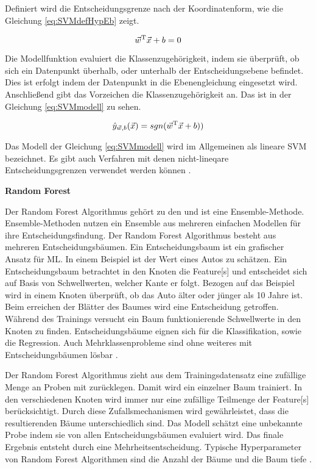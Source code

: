 
Definiert wird die Entscheidungsgrenze nach der Koordinatenform, wie die Gleichung \ref{eq:SVMdefHypEb} zeigt.

\begin{equation}
\vec{w}^\mathrm{T}\vec{x}+b=0
\label{eq:SVMdefHypEb}
\end{equation}

Die Modellfunktion evaluiert die Klassenzugehörigkeit, indem sie überprüft, ob sich ein Datenpunkt überhalb, oder unterhalb der Entscheidungsebene befindet. Dies ist erfolgt indem der Datenpunkt in die Ebenengleichung eingesetzt wird. Anschließend gibt das Vorzeichen die Klassenzugehörigkeit an. Das ist in der Gleichung \ref{eq:SVMmodell} zu sehen. 

\begin{equation}
\hat{y}_{\vec{w},b}(\vec{x}) = sgn(\vec{w}^\mathrm{T}\vec{x}+b))
\label{eq:SVMmodell}
\end{equation}

Das Modell der Gleichung \ref{eq:SVMmodell} wird im Allgemeinen als lineare \acrshort{SVM} bezeichnet. Es gibt auch Verfahren mit denen nicht-lineqare Entscheidungsgrenzen verwendet werden können \cite{Burkov.2019, Goodfellow.2016, ShalevShwartz.2014}. \dubpar

\textbf{Random Forest}\par
Der Random Forest Algorithmus gehört zu den  und ist eine Ensemble-Methode. Ensemble-Methoden nutzen ein Ensemble aus mehreren einfachen Modellen für ihre Entscheidungsfindung. Der Random Forest Algorithmus besteht aus mehreren Entscheidungsbäumen. Ein Entscheidungsbaum ist ein grafischer Ansatz für \gls{ML}. In einem Beispiel ist der Wert eines Autos zu schätzen. Ein Entscheidungsbaum betrachtet in den Knoten die \gls{Feature}[s] und entscheidet sich auf Basis von Schwellwerten, welcher Kante er folgt. Bezogen auf das Beispiel wird in einem Knoten überprüft, ob das Auto älter oder jünger als 10 Jahre ist. Beim erreichen der Blätter des Baumes wird eine Entscheidung getroffen. Während des Trainings versucht ein Baum funktionierende Schwellwerte in den Knoten zu finden. Entscheidungsbäume eignen sich für die \gls{Klassifikation}, sowie die Regression. Auch Mehrklassenprobleme sind ohne weiteres mit Entscheidungsbäumen lösbar \cite{Burkov.2019, Bishop.2006, Goodfellow.2016}. \par

Der Random Forest Algorithmus zieht aus dem \gls{Trainingsdatensatz} eine zufällige Menge an Proben mit zurücklegen. Damit wird ein einzelner Baum trainiert. In den verschiedenen Knoten wird immer nur eine zufällige Teilmenge der \gls{Feature}[s] berücksichtigt. Durch diese Zufallsmechanismen wird gewährleistet, dass die resultierenden Bäume unterschiedlich sind. Das Modell schätzt eine unbekannte Probe indem sie von allen Entscheidungsbäumen evaluiert wird. Das finale Ergebnis entsteht durch eine Mehrheitsentscheidung. Typische \gls{Hyperparameter} von  Random Forest Algorithmen sind die Anzahl der Bäume und die Baum tiefe \cite{Burkov.2019, Breiman.2001}. \dubpar


